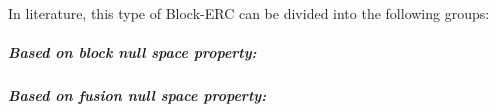 In literature, this type of Block-ERC can be divided into the following groups:
\subparagraph{Based on block null space property:}

\subparagraph{Based on fusion null space property:}
